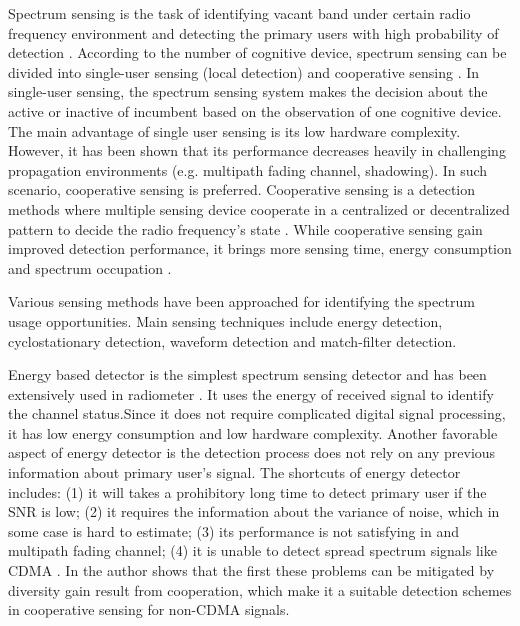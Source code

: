 Spectrum sensing is the task of identifying vacant band under certain radio frequency environment and detecting the primary users with high probability of detection  \cite{umar2012spectrum}. 
According to the number of cognitive device, spectrum sensing can be divided into single-user sensing (local detection) and cooperative sensing \cite{akyildiz2011cooperative, ma2008soft, axell2010overview, wang2011advances}. In single-user sensing, the spectrum sensing system makes the decision about the active or inactive of incumbent based on the observation of one cognitive device. The main advantage of single user sensing is its low hardware complexity. However, it has been shown that its performance decreases heavily in challenging propagation environments (e.g. multipath fading channel, shadowing). In such scenario, cooperative sensing is preferred. Cooperative sensing is a detection methods where multiple sensing device cooperate in a centralized  or decentralized  pattern to decide the radio frequency's state \cite{ganesan2005cooperative, arslan2007cognitive}. While cooperative sensing gain improved detection performance, it brings more sensing time, energy consumption and spectrum occupation \cite{akyildiz2011cooperative}.  

Various sensing methods have been approached for identifying the spectrum usage opportunities. Main sensing techniques include  energy detection, cyclostationary detection, waveform detection and match-filter detection.  

Energy based detector is the simplest spectrum sensing detector and has been extensively used in radiometer \cite{cabric2004implementation, poor1994introduction, urkowitz1967energy}. It uses the energy of received signal to identify the channel status.Since it does not require complicated digital signal processing, it has low energy consumption and low hardware complexity.  Another favorable aspect of energy detector is the detection process does not rely on  any previous information about primary user's signal.  
The shortcuts of energy detector includes: (1) it will takes a prohibitory long time to detect primary user if the SNR is low; (2) it requires the information about the variance of noise, which in some case is hard to estimate; (3) its performance is not satisfying in and multipath fading channel; (4) it is unable to detect spread spectrum signals like CDMA \cite{urkowitz1967energy, akyildiz2011cooperative}. 
In \cite{akyildiz2011cooperative} the author shows that the first these problems can be mitigated by diversity gain result from cooperation, which make it a suitable detection schemes in cooperative sensing for non-CDMA signals.  

